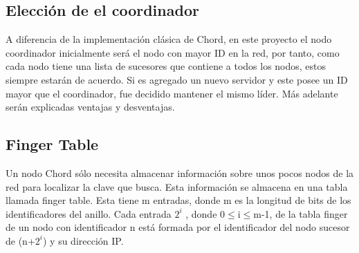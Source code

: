 \documentclass[10pt, a4paper]{article}
\begin{document}
    \subsection{Elecci\'on de el coordinador}
    A diferencia de la implementación clásica de Chord, en este proyecto el nodo coordinador inicialmente será el nodo con mayor ID en la red, por tanto, como cada nodo tiene una lista de sucesores que contiene a todos los nodos, estos siempre estarán de acuerdo. Si es agregado un nuevo servidor y este posee un ID mayor que el coordinador, fue decidido mantener el mismo líder. Más adelante serán explicadas ventajas y desventajas.\\
    
    \subsection{Finger Table} 
    Un nodo Chord sólo necesita almacenar información sobre unos pocos nodos de la red para localizar la clave que busca. Esta información se almacena en una tabla llamada finger table. Esta tiene m entradas, donde m es la longitud de bits de los identificadores del anillo. Cada entrada $2^i$ , donde 0$\leq$i$\leq$m-1, de la tabla finger de un nodo con identificador n está formada por el identificador del nodo sucesor de (n+$2^i$) y su dirección IP.\\
    
\end{document}
